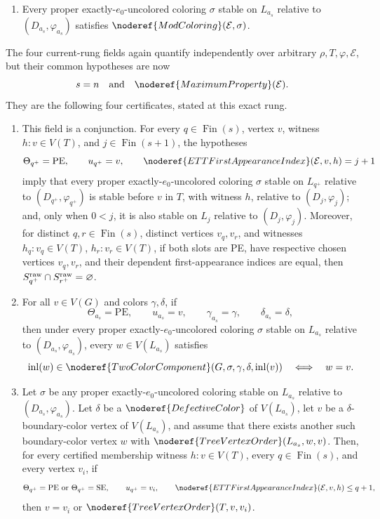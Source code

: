\begin{definition}
\begin{enumerate}
\item[\texttt{lowerSix}.]
Every proper exactly-\(e_0\)-uncolored coloring \(\sigma\) stable on
\(L_{a_s}\) relative to \((D_{a_s},\varphi_{a_s})\) satisfies
\(\noderef{ModColoring}(\mathcal E,\sigma)\).
\end{enumerate}

The four current-rung fields again quantify independently over arbitrary
\(\rho,T,\varphi,\mathcal E\), but their common hypotheses are now
\[
  s=n \quad\hbox{and}\quad \noderef{MaximumProperty}(\mathcal E).
\]
They are the following four certificates, stated at this exact rung.

\begin{enumerate}
\item[\texttt{currentThree}.]
This field is a conjunction.  For every
\(q\in\operatorname{Fin}(s)\), vertex \(v\), witness \(h:v\in V(T)\), and
\(j\in\operatorname{Fin}(s+1)\), the hypotheses
\[
 \Theta_{q^+}=\mathrm{PE},\qquad u_{q^+}=v,\qquad
 \noderef{ETTFirstAppearanceIndex}(\mathcal E,v,h)=j+1
\]
imply that every proper exactly-\(e_0\)-uncolored coloring \(\sigma\)
stable on \(L_{q^+}\) relative to
\((D_{q^+},\varphi_{q^+})\) is stable before \(v\) in \(T\), with witness
\(h\), relative to \((D_j,\varphi_j)\); and, only when \(0<j\), it is also
stable on \(L_j\) relative to \((D_j,\varphi_j)\).
Moreover, for distinct \(q,r\in\operatorname{Fin}(s)\), distinct vertices
\(v_q,v_r\), and witnesses \(h_q:v_q\in V(T)\),
\(h_r:v_r\in V(T)\), if both slots are PE, have respective chosen vertices
\(v_q,v_r\), and their dependent first-appearance indices are equal, then
\(S_{q^+}^{\rm raw}\cap S_{r^+}^{\rm raw}=\varnothing\).

\item[\texttt{currentFour}.]
For all \(v\in V(G)\) and colors \(\gamma,\delta\), if
\[
 \Theta_{a_s}=\mathrm{PE},\qquad u_{a_s}=v,\qquad
 \gamma_{a_s}=\gamma,\qquad\delta_{a_s}=\delta,
\]
then under every proper exactly-\(e_0\)-uncolored coloring \(\sigma\)
stable on \(L_{a_s}\) relative to
\((D_{a_s},\varphi_{a_s})\), every \(w\in V(L_{a_s})\) satisfies
\[
 \operatorname{inl}(w)\in
   \noderef{TwoColorComponent}(G,\sigma,\gamma,\delta,
      \operatorname{inl}(v))
 \quad\Longleftrightarrow\quad w=v.
\]

\item[\texttt{currentFive}.]
Let \(\sigma\) be any proper exactly-\(e_0\)-uncolored coloring stable on
\(L_{a_s}\) relative to \((D_{a_s},\varphi_{a_s})\).  Let \(\delta\) be a
\(\noderef{DefectiveColor}\) of \(V(L_{a_s})\), let \(v\) be a
\(\delta\)-boundary-color vertex of \(V(L_{a_s})\), and assume that there
exists another such boundary-color vertex \(w\) with
\(\noderef{TreeVertexOrder}(L_{a_s},w,v)\).  Then, for every certified
membership witness \(h:v\in V(T)\), every
\(q\in\operatorname{Fin}(s)\), and every vertex \(v_i\), if
\[
 \Theta_{q^+}=\mathrm{PE}\ \hbox{or}\
 \Theta_{q^+}=\mathrm{SE},\qquad
 u_{q^+}=v_i,\qquad
 \noderef{ETTFirstAppearanceIndex}(\mathcal E,v,h)\leq q+1,
\]
then \(v=v_i\) or \(\noderef{TreeVertexOrder}(T,v,v_i)\).


\end{enumerate}
\end{definition}
